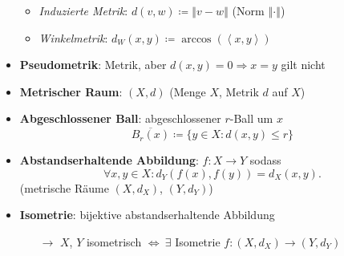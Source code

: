 \begin{itemize}
\begin{itemize}
    \item \emph{Induzierte Metrik}: \( d(v,w) \coloneqq \left\Vert v - w \right\Vert \) (Norm \( \left\Vert \cdot \right\Vert \))
    \item \emph{Winkelmetrik}: \( d_W(x,y) \coloneqq \arccos(\left\langle x,y \right\rangle) \)
  \end{itemize}
  \item \textbf{Pseudometrik}: Metrik, aber \( d(x,y) = 0 \Rightarrow x = y \) gilt nicht
  \item \textbf{Metrischer Raum}: \( (X,d) \) (Menge \( X \), Metrik \( d \) auf \( X \))
  \item \textbf{Abgeschlossener Ball}: abgeschlossener \( r \)-Ball um \( x \)
  \begin{equation*}
    \overline{B_r(x)} \coloneqq \{ y \in X : d(x,y) \leq r \}
  \end{equation*}
  \item \textbf{Abstandserhaltende Abbildung}: \( f: X \to Y \) sodass
  \begin{equation*}
    \forall x, y \in X: d_Y(f(x), f(y)) = d_X(x, y)\text{.}
  \end{equation*} 
  (metrische Räume \( (X, d_X) \), \( (Y, d_Y) \))
  \item \textbf{Isometrie}: bijektive abstandserhaltende Abbildung
  \begin{itemize}
    \item[\( \to \)] \( X \), \( Y \) isometrisch \( \Leftrightarrow \ \exists \) Isometrie \( f: (X, d_X) \to (Y, d_Y) \)
  \end{itemize}
\end{itemize}